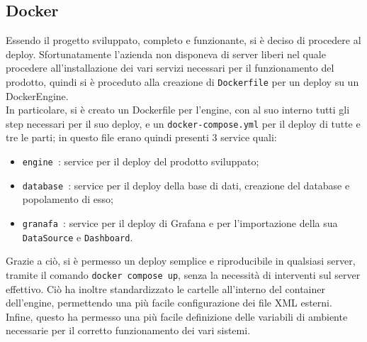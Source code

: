 		\subsection{Docker}
			Essendo il progetto sviluppato, completo e funzionante, si è deciso di procedere al deploy. Sfortunatamente l'azienda non disponeva di server liberi nel quale procedere all'installazione dei vari servizi necessari per il funzionamento del prodotto, quindi si è proceduto alla creazione di \texttt{Dockerfile} per un deploy su un DockerEngine.\\
			In particolare, si è creato un Dockerfile per l'engine, con al suo interno tutti gli step necessari per il suo deploy, e un \texttt{docker-compose.yml} per il deploy di tutte e tre le parti; in questo file erano quindi presenti 3 service quali:
			\begin{itemize}
					\item \texttt{engine }: service per il deploy del prodotto sviluppato;
					\item \texttt{database }: service per il deploy della base di dati, creazione del database e popolamento di esso;
					\item \texttt{granafa }:  service per il deploy di Grafana e per l'importazione della sua \texttt{DataSource} e \texttt{Dashboard}.
			\end{itemize}
			Grazie a ciò, si è permesso un deploy semplice e riproducibile in qualsiasi server, tramite il comando \texttt{docker compose up}, senza la necessità di interventi sul server effettivo. Ciò ha inoltre standardizzato le cartelle all'interno del container dell'engine, permettendo una più facile configurazione dei file XML esterni.\\
			Infine, questo ha permesso una più facile definizione delle variabili di ambiente necessarie per il corretto funzionamento dei vari sistemi.
			
